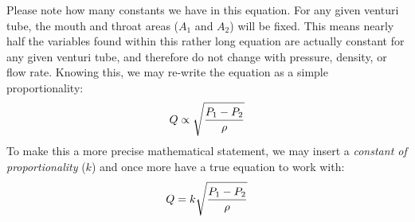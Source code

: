 \documentclass{beamer}
\begin{document}
\begin{frame}
	\frametitle{}

	



%
Please note how many constants we have in this equation.  For any given venturi tube, the mouth and throat areas ($A_1$ and $A_2$) will be fixed.  This means nearly half the variables found within this rather long equation are actually constant for any given venturi tube, and therefore do not change with pressure, density, or flow rate.  Knowing this, we may re-write the equation as a simple proportionality:
%
$$Q \propto \sqrt{{P_1 - P_2} \over \rho}$$
%
To make this a more precise mathematical statement, we may insert a \textit{constant of proportionality} ($k$) and once more have a true equation to work with:  
%
$$Q = k \sqrt{{P_1 - P_2} \over \rho}$$
%
%
\end{frame}
%
%
%
%
\end{document}
